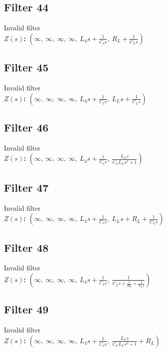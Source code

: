 \documentclass{article}
\begin{document}
\subsection*{Filter 44}
Invalid filter \\ 
\textbf{$Z(s)$:} $\left( \infty, \  \infty, \  \infty, \  \infty, \  L_{4} s + \frac{1}{C_{4} s}, \  R_{L} + \frac{1}{C_{L} s}\right)$ \\ 
\subsection*{Filter 45}
Invalid filter \\ 
\textbf{$Z(s)$:} $\left( \infty, \  \infty, \  \infty, \  \infty, \  L_{4} s + \frac{1}{C_{4} s}, \  L_{L} s + \frac{1}{C_{L} s}\right)$ \\ 
\subsection*{Filter 46}
Invalid filter \\ 
\textbf{$Z(s)$:} $\left( \infty, \  \infty, \  \infty, \  \infty, \  L_{4} s + \frac{1}{C_{4} s}, \  \frac{L_{L} s}{C_{L} L_{L} s^{2} + 1}\right)$ \\ 
\subsection*{Filter 47}
Invalid filter \\ 
\textbf{$Z(s)$:} $\left( \infty, \  \infty, \  \infty, \  \infty, \  L_{4} s + \frac{1}{C_{4} s}, \  L_{L} s + R_{L} + \frac{1}{C_{L} s}\right)$ \\ 
\subsection*{Filter 48}
Invalid filter \\ 
\textbf{$Z(s)$:} $\left( \infty, \  \infty, \  \infty, \  \infty, \  L_{4} s + \frac{1}{C_{4} s}, \  \frac{1}{C_{L} s + \frac{1}{R_{L}} + \frac{1}{L_{L} s}}\right)$ \\ 
\subsection*{Filter 49}
Invalid filter \\ 
\textbf{$Z(s)$:} $\left( \infty, \  \infty, \  \infty, \  \infty, \  L_{4} s + \frac{1}{C_{4} s}, \  \frac{L_{L} s}{C_{L} L_{L} s^{2} + 1} + R_{L}\right)$ \\ 
\end{document}
